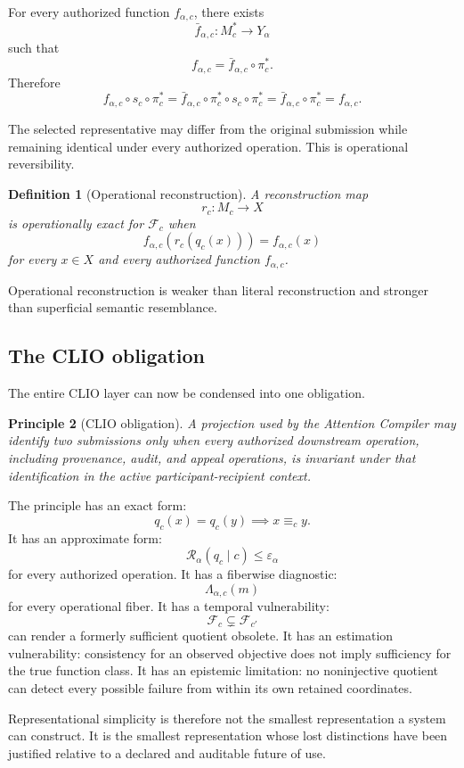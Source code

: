 \documentclass[11pt]{article}
\newtheorem{definition}{Definition}[section]
\newtheorem{principle}[definition]{Principle}
\theoremstyle{definition}
\newcommand{\F}{\mathcal{F}}
\newcommand{\eps}{\varepsilon}
\begin{document}
For every authorized function \(f_{\alpha,c}\), there exists
\[
\bar f_{\alpha,c}:M_c^{*}\to Y_\alpha
\]
such that
\[
f_{\alpha,c}
=
\bar f_{\alpha,c}\circ\pi_c^{*}.
\]
Therefore
\[
f_{\alpha,c}\circ s_c\circ\pi_c^{*}
=
\bar f_{\alpha,c}\circ
\pi_c^{*}\circ
s_c\circ
\pi_c^{*}
=
\bar f_{\alpha,c}\circ\pi_c^{*}
=
f_{\alpha,c}.
\]

The selected representative may differ from the original submission while remaining identical under every authorized operation. This is operational reversibility.

\begin{definition}[Operational reconstruction]
A reconstruction map
\[
r_c:M_c\to X
\]
is operationally exact for \(\F_c\) when
\[
f_{\alpha,c}(r_c(q_c(x)))
=
f_{\alpha,c}(x)
\]
for every \(x\in X\) and every authorized function \(f_{\alpha,c}\).
\end{definition}

Operational reconstruction is weaker than literal reconstruction and stronger than superficial semantic resemblance.

\subsection{The CLIO obligation}

The entire CLIO layer can now be condensed into one obligation.

\begin{principle}[CLIO obligation]
A projection used by the Attention Compiler may identify two submissions only when every authorized downstream operation, including provenance, audit, and appeal operations, is invariant under that identification in the active participant-recipient context.
\end{principle}

The principle has an exact form:
\[
q_c(x)=q_c(y)
\implies
x\equiv_c y.
\]
It has an approximate form:
\[
\mathcal R_\alpha(q_c\mid c)\leq\eps_\alpha
\]
for every authorized operation. It has a fiberwise diagnostic:
\[
\Lambda_{\alpha,c}(m)
\]
for every operational fiber. It has a temporal vulnerability:
\[
\F_c\subsetneq\F_{c'}
\]
can render a formerly sufficient quotient obsolete. It has an estimation vulnerability: consistency for an observed objective does not imply sufficiency for the true function class. It has an epistemic limitation: no noninjective quotient can detect every possible failure from within its own retained coordinates.

Representational simplicity is therefore not the smallest representation a system can construct. It is the smallest representation whose lost distinctions have been justified relative to a declared and auditable future of use.
\end{document}
